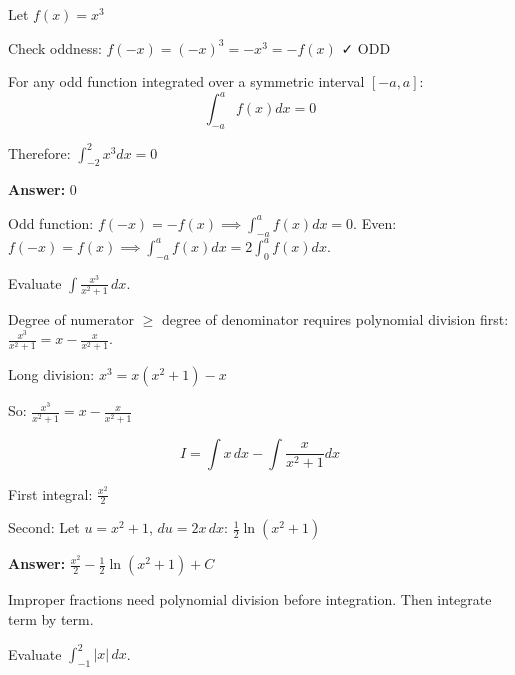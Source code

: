 \begin{solution}
Let $f(x) = x^3$

Check oddness: $f(-x) = (-x)^3 = -x^3 = -f(x)$ ✓ ODD

For any odd function integrated over a symmetric interval $[-a, a]$:
\[
\int_{-a}^a f(x)dx = 0
\]

Therefore: $\int_{-2}^2 x^3 dx = 0$

\textbf{Answer:} $\boxed{0}$
\end{solution}

\begin{takeaways}
Odd function: $f(-x) = -f(x) \implies \int_{-a}^a f(x)dx = 0$. Even: $f(-x) = f(x) \implies \int_{-a}^a f(x)dx = 2\int_0^a f(x)dx$.
\end{takeaways}

\vspace{1cm}

\begin{problem}
Evaluate $\displaystyle \int \frac{x^3}{x^2+1} \, dx$.
\end{problem}

\begin{hint}
Degree of numerator $\ge$ degree of denominator requires polynomial division first: $\frac{x^3}{x^2+1} = x - \frac{x}{x^2+1}$.
\end{hint}

\begin{solution}
Long division: $x^3 = x(x^2+1) - x$

So: $\frac{x^3}{x^2+1} = x - \frac{x}{x^2+1}$

\[
I = \int x \, dx - \int \frac{x}{x^2+1} dx
\]

First integral: $\frac{x^2}{2}$

Second: Let $u=x^2+1$, $du=2x \, dx$: $\frac{1}{2}\ln(x^2+1)$

\textbf{Answer:} $\boxed{\frac{x^2}{2} - \frac{1}{2}\ln(x^2+1) + C}$
\end{solution}

\begin{takeaways}
Improper fractions need polynomial division before integration. Then integrate term by term.
\end{takeaways}

\vspace{1cm}

\begin{problem}
Evaluate $\displaystyle \int_{-1}^{2} |x| \, dx$.
\end{problem}

